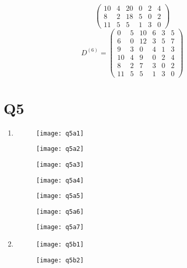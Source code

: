 \documentclass[12pt,a4paper]{article}
\begin{document}
\begin{enumerate}[label=(\alph*)]
\[\begin{pmatrix}
				10 & 4 & 20 & 0 & 2 & 4 \\
				8 & 2 & 18 & 5 & 0 & 2 \\
				11 & 5 & 5 & 1 & 3 & 0
			\end{pmatrix}
		\]
		\[
			D^{(6)} =
			\begin{pmatrix}
				0 & 5 & 10 & 6 & 3 & 5 \\
				6 & 0 & 12 & 3 & 5 & 7 \\
				9 & 3 & 0 & 4 & 1 & 3 \\
				10 & 4 & 9 & 0 & 2 & 4 \\
				8 & 2 & 7 & 3 & 0 & 2 \\
				11 & 5 & 5 & 1 & 3 & 0
			\end{pmatrix}
		\]
	\end{enumerate}

\newpage
\section*{Q5}
	\begin{enumerate}[label=(\alph*)]
		\item \-
		\begin{figure}[h!]
			\texttt{[image: q5a1]}
			\centering
		\end{figure}
		\begin{figure}[h!]
			\texttt{[image: q5a2]}
			\centering
		\end{figure}
		\begin{figure}[h!]
			\texttt{[image: q5a3]}
			\centering
		\end{figure}
		\begin{figure}[h!]
			\texttt{[image: q5a4]}
			\centering
		\end{figure}
		\begin{figure}[h!]
			\texttt{[image: q5a5]}
			\centering
		\end{figure}
		\begin{figure}[h!]
			\texttt{[image: q5a6]}
			\centering
		\end{figure}
		\begin{figure}[h!]
			\texttt{[image: q5a7]}
			\centering
		\end{figure}

		\clearpage
		\newpage
		\item \-
		\begin{figure}[h!]
			\texttt{[image: q5b1]}
			\centering
		\end{figure}
		\begin{figure}[h!]
			\texttt{[image: q5b2]}
			\centering
		\end{figure}

	\end{enumerate}
	
\end{document}
